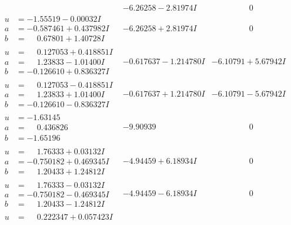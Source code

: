 \documentclass[1p]{elsarticle_modified}
\theoremstyle{definition}
\begin{document}
$$\begin{array}{c|c|c}
 & -6.26258 - 2.81974 I & \phantom{-0.000000 } 0 \\ \hline\begin{aligned}
u &= -1.55519 - 0.00032 I \\
a &= -0.587461 + 0.437982 I \\
b &= \phantom{-}0.67801 + 1.40728 I\end{aligned}
 & -6.26258 + 2.81974 I & \phantom{-0.000000 } 0 \\ \hline\begin{aligned}
u &= \phantom{-}0.127053 + 0.418851 I \\
a &= \phantom{-}1.23833 - 1.01400 I \\
b &= -0.126610 + 0.836327 I\end{aligned}
 & -0.617637 - 1.214780 I & -6.10791 + 5.67942 I \\ \hline\begin{aligned}
u &= \phantom{-}0.127053 - 0.418851 I \\
a &= \phantom{-}1.23833 + 1.01400 I \\
b &= -0.126610 - 0.836327 I\end{aligned}
 & -0.617637 + 1.214780 I & -6.10791 - 5.67942 I \\ \hline\begin{aligned}
u &= -1.63145\phantom{ +0.000000I} \\
a &= \phantom{-}0.436826\phantom{ +0.000000I} \\
b &= -1.65196\phantom{ +0.000000I}\end{aligned}
 & -9.90939\phantom{ +0.000000I} & \phantom{-0.000000 } 0 \\ \hline\begin{aligned}
u &= \phantom{-}1.76333 + 0.03132 I \\
a &= -0.750182 + 0.469345 I \\
b &= \phantom{-}1.20433 + 1.24812 I\end{aligned}
 & -4.94459 + 6.18934 I & \phantom{-0.000000 } 0 \\ \hline\begin{aligned}
u &= \phantom{-}1.76333 - 0.03132 I \\
a &= -0.750182 - 0.469345 I \\
b &= \phantom{-}1.20433 - 1.24812 I\end{aligned}
 & -4.94459 - 6.18934 I & \phantom{-0.000000 } 0 \\ \hline\begin{aligned}
u &= \phantom{-}0.222347 + 0.057423 I \\

\end{aligned}
\end{array}$$
\end{document}
